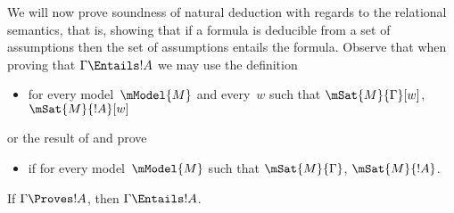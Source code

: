 \documentclass[../../../include/open-logic-section]{subfiles}
\begin{document}


We will now prove soundness of natural deduction with regards to the 
relational semantics, that is, showing that if a formula is deducible from
a set of assumptions then the set of assumptions entails the formula. Observe that
when proving that $\Gamma \Entails !A$ we may use the definition
\begin{itemize}
  \item for every model~$\mModel{M}$ and every~$w$ such that
$\mSat{M}{\Gamma}[w]$, $\mSat{M}{!A}[w]$
\end{itemize}
or the result of  and  prove
\begin{itemize}
  \item if for every model~$\mModel{M}$ such
  that $\mSat{M}{\Gamma}$, $\mSat{M}{!A}$.
\end{itemize}

\begin{thm}[Soundness]
  If $\Gamma \Proves !A$, then $ \Gamma \Entails !A$.
\end{thm}
\end{document}
